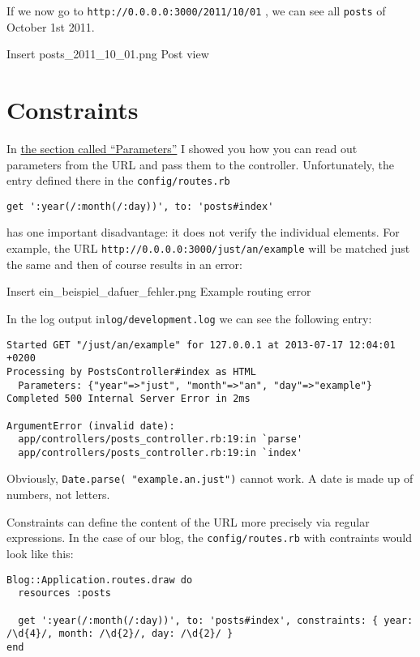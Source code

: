 \documentclass[a4paper]{book}
\begin{document}
If we now go to \texttt{http://0.0.0.0:3000/2011/10/01} , we can see all \texttt{posts} of October 1st 2011.

Insert posts\_2011\_10\_01.png Post view

\section{Constraints}\label{constraints}

In \hyperref[routesux5fmatchux5fparameter]{the section called “Parameters”} I showed you how you can read out parameters from the URL and pass them to the controller. Unfortunately, the entry defined there in the \texttt{config/routes.rb}

\begin{shaded}\begin{verbatim}
get ':year(/:month(/:day))', to: 'posts#index'
\end{verbatim}\end{shaded}

has one important disadvantage: it does not verify the individual elements. For example, the URL \texttt{http://0.0.0.0:3000/just/an/example} will be matched just the same and then of course results in an error:

Insert ein\_beispiel\_dafuer\_fehler.png Example routing error

In the log output in\texttt{log/development.log} we can see the following entry:

\begin{shaded}\begin{verbatim}
Started GET "/just/an/example" for 127.0.0.1 at 2013-07-17 12:04:01 +0200
Processing by PostsController#index as HTML
  Parameters: {"year"=>"just", "month"=>"an", "day"=>"example"}
Completed 500 Internal Server Error in 2ms

ArgumentError (invalid date):
  app/controllers/posts_controller.rb:19:in `parse'
  app/controllers/posts_controller.rb:19:in `index'
\end{verbatim}\end{shaded}

Obviously, \texttt{Date.parse( "example.an.just")} cannot work. A date is made up of numbers, not letters.

Constraints can define the content of the URL more precisely via regular expressions. In the case of our blog, the \texttt{config/routes.rb} with contraints would look like this:

\begin{shaded}\begin{verbatim}
Blog::Application.routes.draw do
  resources :posts

  get ':year(/:month(/:day))', to: 'posts#index', constraints: { year: /\d{4}/, month: /\d{2}/, day: /\d{2}/ }
end
\end{verbatim}\end{shaded}
\end{document}
